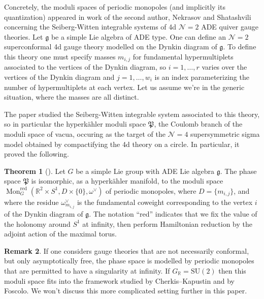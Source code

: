 \documentclass[11pt, oneside, reqno]{amsart}
\theoremstyle{definition} \newtheorem{definition}{Definition}[section]
\newtheorem{theorem}[definition]{Theorem}
\theoremstyle{definition} \newtheorem{remark}[definition]{Remark}
\theoremstyle{definition} \newtheorem{remarks}[definition]{Remarks}
\theoremstyle{definition} \newtheorem{question}[definition]{Question}
\theoremstyle{definition} \newtheorem*{note}{Note}
\theoremstyle{definition} \newtheorem{example}[definition]{Example}
\theoremstyle{definition} \newtheorem{examples}[definition]{Examples}
\renewcommand{\gg}{\mathfrak{g}}
\newcommand{\mc}[1]{\mathcal{#1}}
\newcommand{\mf}[1]{\mathfrak{#1}}
\newcommand{\RR}{\mathbb{R}}
\newcommand{\SU}{\mathrm{SU}}
\DeclareMathOperator{\mon}{Mon}
\newcommand{\red}{\mathrm{red}}
\begin{document}
Concretely, the moduli spaces of periodic monopoles (and implicitly its quantization) appeared in work of the second author, Nekrasov and Shatashvili \cite{NekrasovPestun, NekrasovPestunShatashvili} concerning the Seiberg-Witten integrable systems of 4d $\mc N=2$ ADE quiver gauge theories.  Let $\gg$ be a simple Lie algebra of ADE type.  One can define an $\mc N=2$ superconformal 4d gauge theory modelled on the Dynkin diagram of $\gg$.  To define this theory one must specify masses $m_{i,j}$ for fundamental hypermultiplets associated to the vertices of the Dynkin diagram, so $i = 1,\ldots,r$ varies over the vertices of the Dynkin diagram and $j=1, \ldots,w_i$ is an index parameterizing the number of hypermultiplets at each vertex.  Let us assume we're in the generic situation, where the masses are all distinct.

The paper \cite{NekrasovPestun} studied the Seiberg-Witten integrable system associated to this theory, so in particular the hyperk\"ahler moduli space $\mf P$, the Coulomb branch of the moduli space of vacua,  occuring as the target of the $\mc N=4$ supersymmetric sigma model obtained by compactifying the 4d theory on a circle.  In particular, it proved the following.

\begin{theorem}[{\cite[Section 8.1]{NekrasovPestun}}]
Let $G$ be a simple Lie group with ADE Lie algebra $\gg$.  The phase space $\mf P$ is isomorphic, as a hyperk\"ahler manifold, to the moduli space $\mon_G^\red(\RR^2 \times S^1,D \times\{0\},\omega^\vee)$ of periodic monopoles, where $D = \{m_{i,j}\}$, and where the residue $\omega^\vee_{m_{i,j}}$ is the fundamental coweight corresponding to the vertex $i$ of the Dynkin diagram of $\gg$.  The notation ``red'' indicates that we fix the value of the holonomy around $S^1$ at infinity, then perform Hamiltonian reduction by the adjoint action of the maximal torus.
\end{theorem}

\begin{remark}
If one considers gauge theories that are not necessarily conformal, but only asymptotically free, the phase space is modelled by periodic monopoles that are permitted to have a singularity at infinity.  If $G_\RR = \SU(2)$ then this moduli space fits into the framework studied by Cherkis--Kapustin and by Foscolo.  We won't discuss this more complicated setting further in this paper.
\end{remark}
\end{document}
